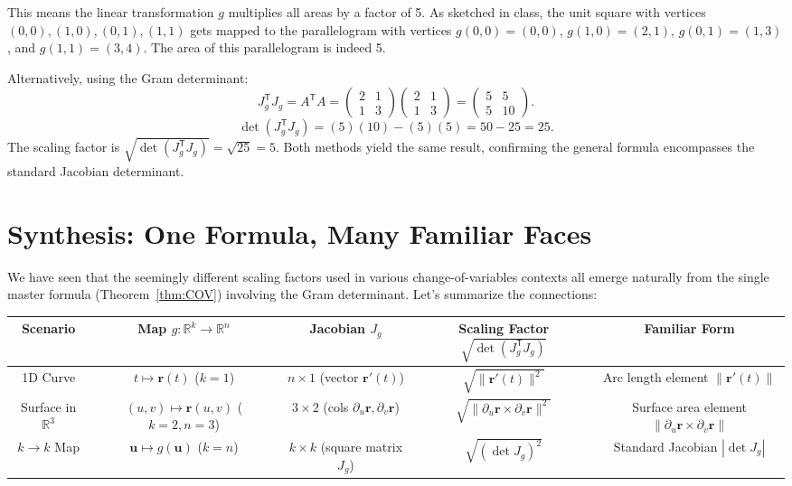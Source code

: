 \documentclass[12pt]{article}
\theoremstyle{definition} %
\theoremstyle{plain} %
\theoremstyle{remark} %
\begin{document}
This means the linear transformation $g$ multiplies all areas by a factor of 5. As sketched in class, the unit square with vertices $(0,0), (1,0), (0,1), (1,1)$ gets mapped to the parallelogram with vertices $g(0,0)=(0,0)$, $g(1,0)=(2,1)$, $g(0,1)=(1,3)$, and $g(1,1)=(3,4)$. The area of this parallelogram is indeed 5.

Alternatively, using the Gram determinant:
\[ J_g^{\mathsf{T}} J_g = A^{\mathsf{T}} A = \begin{pmatrix} 2 & 1 \\ 1 & 3 \end{pmatrix} \begin{pmatrix} 2 & 1 \\ 1 & 3 \end{pmatrix} = \begin{pmatrix} 5 & 5 \\ 5 & 10 \end{pmatrix}. \]
\[ \det(J_g^{\mathsf{T}} J_g) = (5)(10) - (5)(5) = 50 - 25 = 25. \]
The scaling factor is $\sqrt{\det(J_g^{\mathsf{T}} J_g)} = \sqrt{25} = 5$. Both methods yield the same result, confirming the general formula encompasses the standard Jacobian determinant.

\section{Synthesis: One Formula, Many Familiar Faces}

We have seen that the seemingly different scaling factors used in various change-of-variables contexts all emerge naturally from the single master formula (Theorem~\ref{thm:COV}) involving the Gram determinant. Let's summarize the connections:

\begin{center}
\renewcommand{\arraystretch}{1.5} %
\begin{tabular}{|c|c|c|c|c|}
\hline
\textbf{Scenario} & \textbf{Map} $g: \mathbb{R}^k \to \mathbb{R}^n$ & \textbf{Jacobian} $J_g$ & \textbf{Scaling Factor} $\sqrt{\det(J_g^{\mathsf{T}}J_g)}$ & \textbf{Familiar Form} \\ \hline\hline
1D Curve & $t \mapsto \mathbf{r}(t)$ ($k=1$) & $n \times 1$ (vector $\mathbf{r}'(t)$) & $\sqrt{\|\mathbf{r}'(t)\|^2}$ & Arc length element $\|\mathbf{r}'(t)\|$ \\ \hline
Surface in $\mathbb{R}^3$ & $(u,v) \mapsto \mathbf{r}(u,v)$ ($k=2, n=3$) & $3 \times 2$ (cols $\partial_u\mathbf{r}, \partial_v\mathbf{r}$) & $\sqrt{\|\partial_u\mathbf{r} \times \partial_v\mathbf{r}\|^2}$ & Surface area element $\|\partial_u\mathbf{r} \times \partial_v\mathbf{r}\|$ \\ \hline
$k \to k$ Map & $\mathbf{u} \mapsto g(\mathbf{u})$ ($k=n$) & $k \times k$ (square matrix $J_g$) & $\sqrt{(\det J_g)^2}$ & Standard Jacobian $|\det J_g|$ \\ \hline
\end{tabular}
\renewcommand{\arraystretch}{1} %
\end{center}
\end{document}
